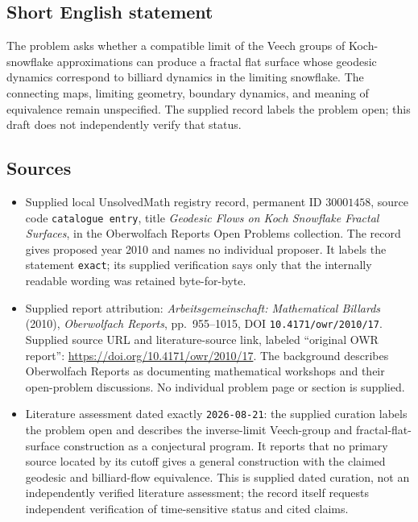 \documentclass[11pt]{article}
\begin{document}
\subsection{Short English statement}
The problem asks whether a compatible limit of the Veech groups of Koch-snowflake approximations can produce a fractal flat surface whose geodesic dynamics correspond to billiard dynamics in the limiting snowflake. The connecting maps, limiting geometry, boundary dynamics, and meaning of equivalence remain unspecified. The supplied record labels the problem open; this draft does not independently verify that status.
\subsection{Sources}
\begin{itemize}
\item Supplied local UnsolvedMath registry record, permanent ID \(30001458\), source code \texttt{catalogue entry}, title \emph{Geodesic Flows on Koch Snowflake Fractal Surfaces}, in the Oberwolfach Reports Open Problems collection. The record gives proposed year 2010 and names no individual proposer. It labels the statement \texttt{exact}; its supplied verification says only that the internally readable wording was retained byte-for-byte.
\item Supplied report attribution: \emph{Arbeitsgemeinschaft: Mathematical Billards} (2010), \emph{Oberwolfach Reports}, pp.~955--1015, DOI \texttt{10.4171/owr/2010/17}. Supplied source URL and literature-source link, labeled ``original OWR report'': \url{https://doi.org/10.4171/owr/2010/17}. The background describes Oberwolfach Reports as documenting mathematical workshops and their open-problem discussions. No individual problem page or section is supplied.
\item Literature assessment dated exactly \texttt{2026-08-21}: the supplied curation labels the problem open and describes the inverse-limit Veech-group and fractal-flat-surface construction as a conjectural program. It reports that no primary source located by its cutoff gives a general construction with the claimed geodesic and billiard-flow equivalence. This is supplied dated curation, not an independently verified literature assessment; the record itself requests independent verification of time-sensitive status and cited claims.
\end{itemize}
\end{document}
